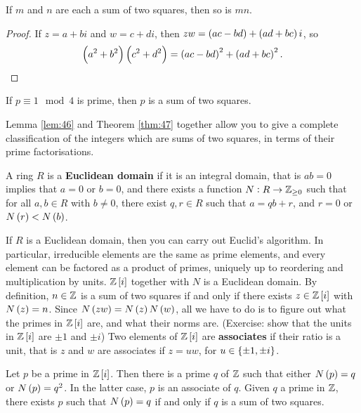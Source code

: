 \begin{lemma}
\label{lem:46}
If $ m $ and $ n $ are each a sum of two squares, then so is $ mn $.
\end{lemma}

\begin{proof}
If $ z = a + bi $ and $ w = c + di $, then $ zw = \br{ac - bd} + \br{ad + bc}i $, so
$$ \br{a^2 + b^2}\br{c^2 + d^2} = \br{ac - bd}^2 + \br{ad + bc}^2. $$
\end{proof}

\begin{theorem}
\label{thm:47}
If $ p \equiv 1 \mod 4 $ is prime, then $ p $ is a sum of two squares.
\end{theorem}

Lemma \ref{lem:46} and Theorem \ref{thm:47} together allow you to give a complete classification of the integers which are sums of two squares, in terms of their prime factorisations.

\begin{definition}
A ring $ R $ is a \textbf{Euclidean domain} if it is an integral domain, that is $ ab = 0 $ implies that $ a = 0 $ or $ b = 0 $, and there exists a function $ N : R \to \mathbb{Z}_{\ge 0} $ such that for all $ a, b \in R $ with $ b \ne 0 $, there exist $ q, r \in R $ such that $ a = qb + r $, and $ r = 0 $ or $ N\br{r} < N\br{b} $.
\end{definition}

If $ R $ is a Euclidean domain, then you can carry out Euclid's algorithm. In particular, irreducible elements are the same as prime elements, and every element can be factored as a product of primes, uniquely up to reordering and multiplication by units. $ \Z\sbr{i} $ together with $ N $ is a Euclidean domain. By definition, $ n \in \mathbb{Z} $ is a sum of two squares if and only if there exists $ z \in \Z\sbr{i} $ with $ N\br{z} = n $. Since $ N\br{zw} = N\br{z}N\br{w} $, all we have to do is to figure out what the primes in $ \Z\sbr{i} $ are, and what their norms are. (Exercise: show that the units in $ \Z\sbr{i} $ are $ \pm 1 $ and $ \pm i $) Two elements of $ \Z\sbr{i} $ are \textbf{associates} if their ratio is a unit, that is $ z $ and $ w $ are associates if $ z = uw $, for $ u \in \cbr{\pm 1, \pm i} $.


\begin{lemma}
Let $ p $ be a prime in $ \Z\sbr{i} $. Then there is a prime $ q $ of $ \mathbb{Z} $ such that either $ N\br{p} = q $ or $ N\br{p} = q^2 $. In the latter case, $ p $ is an associate of $ q $. Given $ q $ a prime in $ \mathbb{Z} $, there exists $ p $ such that $ N\br{p} = q $ if and only if $ q $ is a sum of two squares.
\end{lemma}

